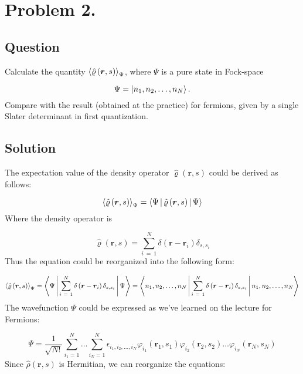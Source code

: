 \section*{Problem 2.}
\subsection*{Question}
Calculate the quantity $\Braket{\hat{\varrho} \left( \boldsymbol{r}, s \right)}_{\Psi}$, where $\Psi$ is a pure state in Fock-space

\begin{equation*}
\Psi = \ket{n_{1}, n_{2}, \dots, n_{N}}.
\end{equation*}
Compare with the result (obtained at the practice) for fermions, given by a single Slater determinant in first quantization.

\subsection*{Solution}
The expectation value of the density operator $\hat{\varrho} \left( \boldsymbol{r}, s \right)$ could be derived as follows:

\begin{equation} \label{eq:6}
\Braket{\hat{\varrho} \left( \boldsymbol{r}, s \right)}_{\Psi}
=
\Braket{\Psi | \hat{\varrho} \left( \boldsymbol{r}, s \right) | \Psi}
\end{equation}
Where the density operator is

\begin{equation} \label{eq:7}
\hat{\varrho} \left( \boldsymbol{r}, s \right)
=
\sum_{i\ =\ 1}^{N} \delta \left( \boldsymbol{r} - \boldsymbol{r}_{i} \right) \delta_{s,s_{i}}
\end{equation}
Thus the equation could be reorganized into the following form:

\begin{equation} \label{eq:8}
\Braket{\hat{\varrho} \left( \boldsymbol{r}, s \right)}_{\Psi}
=
\Braket{\Psi | \sum_{i\ =\ 1}^{N} \delta \left( \boldsymbol{r} - \boldsymbol{r}_{i} \right) \delta_{s,s_{i}} | \Psi}
=
\Braket{n_{1}, n_{2}, \dots, n_{N} | \sum_{i\ =\ 1}^{N} \delta \left( \boldsymbol{r} - \boldsymbol{r}_{i} \right) \delta_{s,s_{i}} | n_{1}, n_{2}, \dots, n_{N}}
\end{equation}
The wavefunction $\Psi$ could be expressed as we've learned on the lecture for Fermions:

\begin{equation} \label{eq:9}
\Psi
=
\frac{1}{\sqrt{N!}}
\sum_{i_{1} = 1}^{N} \dots \sum_{i_{N} = 1}^{N}
\epsilon_{i_{1}, i_{2}, \dots, i_{N}}
\varphi_{i_{1}} \left( \boldsymbol{r}_{1}, s_{1} \right)
\varphi_{i_{2}} \left( \boldsymbol{r}_{2}, s_{2} \right)
\dots
\varphi_{i_{N}} \left( \boldsymbol{r}_{N}, s_{N} \right)
\end{equation}
Since $\hat{\rho} \left( \boldsymbol{r}, s \right)$ is Hermitian, we can reorganize the equations:

